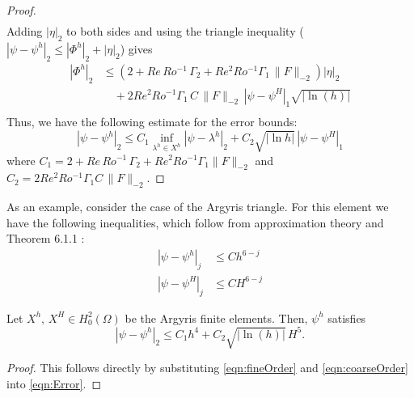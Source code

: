 \begin{proof}
\begin{align*}
  \end{align*}
  Adding $|\eta|_2$ to both sides and using the triangle inequality ($|\psi -
  \psi^h|_2 \le |\Phi^h|_2 + |\eta|_2$) gives
  \begin{align*}
    |\Phi^h|_2 &\le \left(2 + Re\, Ro^{-1}\, \Gamma_2 + Re^2 Ro^{-1} \Gamma_1\,
      \|F\|_{-2}\right) |\eta|_2 \\
    &\quad + 2 Re^2 Ro^{-1} \Gamma_1\, C\, \|F\|_{-2}\, |\psi - \psi^H|_1
      \sqrt{|\ln(h)|} \\
  \end{align*}
  Thus, we have the following estimate for the error bounds:
  \begin{equation*}
    |\psi-\psi^h|_2 \le C_1 \inf_{\lambda^h\in X^h} |\psi-\lambda^h|_2 + C_2
      \sqrt{|\ln h|}\, |\psi - \psi^H|_1
  \end{equation*}
  where $C_1 = 2 + Re\,Ro^{-1}\, \Gamma_2 + Re^2 Ro^{-1} \Gamma_1 \|F\|_{-2}$
  and $C_2= 2 Re^2 Ro^{-1} \Gamma_1 C\,\|F\|_{-2}$.
\end{proof}

As an example, consider the case of the Argyris triangle. For this element we
have the following inequalities, which follow from approximation theory
\cite{Bernadou94} and Theorem 6.1.1 \cite{Ciarlet}:
\begin{align}
  |\psi - \psi^h|_j &\le Ch^{6-j} \label{eqn:fineOrder} \\
  |\psi - \psi^H|_j &\le CH^{6-j} \label{eqn:coarseOrder}
\end{align}
\begin{corollary} \label{crl:Argyris2L}
  Let $X^h,\, X^H \in H^2_0(\Omega)$ be the Argyris finite elements. Then,
  $\psi^h$ satisfies
  \begin{equation}
    |\psi - \psi^h|_2 \le C_1 h^4 + C_2 \sqrt{|\ln(h)|}\, H^5.
    \label{eqn:TwoLevelError}
  \end{equation}
\end{corollary}
\begin{proof}
  This follows directly by substituting \eqref{eqn:fineOrder} and
  \eqref{eqn:coarseOrder} into \eqref{eqn:Error}.
\end{proof}
